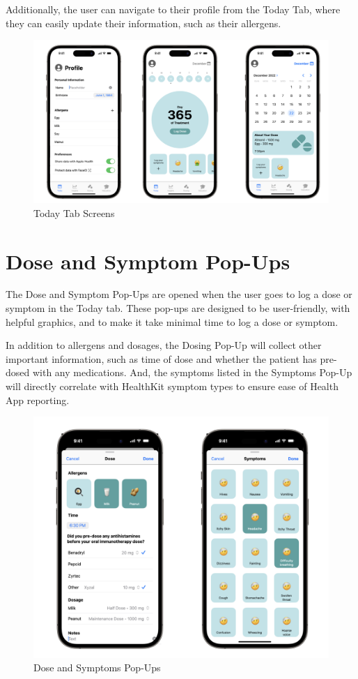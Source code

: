 Additionally, the user can navigate to their profile from the Today Tab, where they can easily update their information, such as their allergens.

\begin{figure}[H]
    \centering
    \includegraphics[width=.7\linewidth]{thesis//chapters//images/todayTabScreens.png}
    \caption{Today Tab Screens}
    \label{fig:today-tab-screens}
\end{figure}

\section{Dose and Symptom Pop-Ups}

The Dose and Symptom Pop-Ups are opened when the user goes to log a dose or symptom in the Today tab. These pop-ups are designed to be user-friendly, with helpful graphics, and to make it take minimal time to log a dose or symptom.

In addition to allergens and dosages, the Dosing Pop-Up will collect other important information, such as time of dose and whether the patient has pre-dosed with any medications. And, the symptoms listed in the Symptoms Pop-Up will directly correlate with HealthKit symptom types to ensure ease of Health App reporting.

\begin{figure}[H]
    \centering
    \includegraphics[width=0.5\linewidth]{thesis//chapters//images/doseAndSymptomPopUps.png}
    \caption{Dose and Symptoms Pop-Ups}
    \label{fig:dose-and-symptom-pop-ups}
\end{figure}

